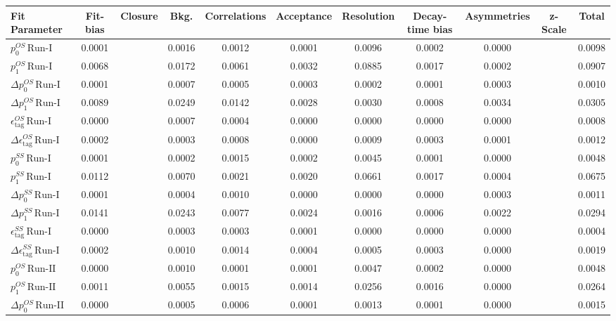 \begin{tabular}{l  c  c  c  c  c  c  c  c  c  | c }
\hline
\hline
Fit Parameter & Fit-bias & Closure & Bkg. & Correlations & Acceptance & Resolution & Decay-time bias & Asymmetries & z-Scale &  Total  \\ 
\hline
$p_{0}^{OS} \, \text{Run-I}$ & 0.0001 &  & 0.0016 & 0.0012 & 0.0001 & 0.0096 & 0.0002 & 0.0000 &  & 0.0098 \\ 
$p_{1}^{OS} \, \text{Run-I}$ & 0.0068 &  & 0.0172 & 0.0061 & 0.0032 & 0.0885 & 0.0017 & 0.0002 &  & 0.0907 \\ 
$\Delta p_{0}^{OS} \, \text{Run-I}$ & 0.0001 &  & 0.0007 & 0.0005 & 0.0003 & 0.0002 & 0.0001 & 0.0003 &  & 0.0010 \\ 
$\Delta p_{1}^{OS} \, \text{Run-I}$ & 0.0089 &  & 0.0249 & 0.0142 & 0.0028 & 0.0030 & 0.0008 & 0.0034 &  & 0.0305 \\ 
$\epsilon_{\text{tag}}^{OS} \, \text{Run-I}$ & 0.0000 &  & 0.0007 & 0.0004 & 0.0000 & 0.0000 & 0.0000 & 0.0000 &  & 0.0008 \\ 
$\Delta \epsilon_{\text{tag}}^{OS} \, \text{Run-I}$ & 0.0002 &  & 0.0003 & 0.0008 & 0.0000 & 0.0009 & 0.0003 & 0.0001 &  & 0.0012 \\ 
$p_{0}^{SS} \, \text{Run-I}$ & 0.0001 &  & 0.0002 & 0.0015 & 0.0002 & 0.0045 & 0.0001 & 0.0000 &  & 0.0048 \\ 
$p_{1}^{SS} \, \text{Run-I}$ & 0.0112 &  & 0.0070 & 0.0021 & 0.0020 & 0.0661 & 0.0017 & 0.0004 &  & 0.0675 \\ 
$\Delta p_{0}^{SS} \, \text{Run-I}$ & 0.0001 &  & 0.0004 & 0.0010 & 0.0000 & 0.0000 & 0.0000 & 0.0003 &  & 0.0011 \\ 
$\Delta p_{1}^{SS} \, \text{Run-I}$ & 0.0141 &  & 0.0243 & 0.0077 & 0.0024 & 0.0016 & 0.0006 & 0.0022 &  & 0.0294 \\ 
$\epsilon_{\text{tag}}^{SS} \, \text{Run-I}$ & 0.0000 &  & 0.0003 & 0.0003 & 0.0001 & 0.0000 & 0.0000 & 0.0000 &  & 0.0004 \\ 
$\Delta \epsilon_{\text{tag}}^{SS} \, \text{Run-I}$ & 0.0002 &  & 0.0010 & 0.0014 & 0.0004 & 0.0005 & 0.0003 & 0.0000 &  & 0.0019 \\ 
$p_{0}^{OS} \, \text{Run-II}$ & 0.0000 &  & 0.0010 & 0.0001 & 0.0001 & 0.0047 & 0.0002 & 0.0000 &  & 0.0048 \\ 
$p_{1}^{OS} \, \text{Run-II}$ & 0.0011 &  & 0.0055 & 0.0015 & 0.0014 & 0.0256 & 0.0016 & 0.0000 &  & 0.0264 \\ 
$\Delta p_{0}^{OS} \, \text{Run-II}$ & 0.0000 &  & 0.0005 & 0.0006 & 0.0001 & 0.0013 & 0.0001 & 0.0000 &  & 0.0015 \\ 

\end{tabular}
